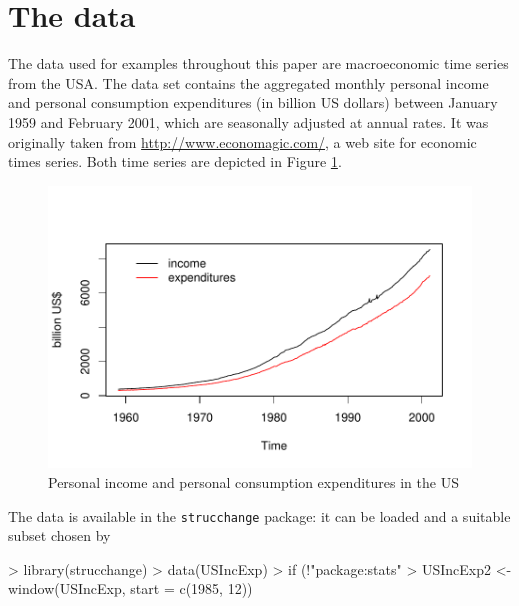 \documentclass[10pt,a4paper]{article}
\begin{document}
\section{The data} \label{sec:data}
The data used for examples throughout this paper are macroeconomic time
series from the USA. The data set contains the aggregated monthly personal
income and
personal consumption expenditures (in billion US dollars) between January 1959
and February 2001, which are seasonally adjusted at annual rates.
It was originally taken from \url{http://www.economagic.com/}, a web site for
economic times series. Both time series are depicted in Figure
\ref{fig:USIncExp}.

\begin{figure}[htbp]
\begin{center}
\includegraphics{strucchange-intro-data}
\caption{\label{fig:USIncExp} Personal income and personal consumption
expenditures in the US}
\end{center}
\end{figure}

The data is
available in the {\tt strucchange} package: it can be loaded and a
suitable subset chosen by
\begin{Schunk}
\begin{Sinput}
> library(strucchange)
> data(USIncExp)
> if (!"package:stats" %
> USIncExp2 <- window(USIncExp, start = c(1985, 12))
\end{Sinput}
\end{Schunk}
\end{document}
